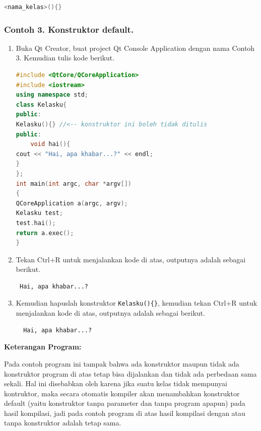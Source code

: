 \begin{lstlisting}[language=c++]
<nama_kelas>(){}
\end{lstlisting}

\subsubsection*{Contoh 3. Konstruktor default.}

\begin{enumerate}
\def\labelenumi{\arabic{enumi}.}
\item
  Buka Qt Creator, buat project Qt Console Application dengan nama
  Contoh 3. Kemudian tulis kode berikut.

\begin{lstlisting}[language=c++]
#include <QtCore/QCoreApplication>
#include <iostream>
using namespace std;
class Kelasku{
public:
Kelasku(){} //<-- konstruktor ini boleh tidak ditulis
public:
    void hai(){
cout << "Hai, apa khabar...?" << endl;
}
};
int main(int argc, char *argv[])
{
QCoreApplication a(argc, argv);
Kelasku test;
test.hai();
return a.exec();
}
\end{lstlisting}
\item
  Tekan Ctrl+R untuk menjalankan kode di atas, outputnya adalah sebagai
  berikut.

\begin{verbatim}
 Hai, apa khabar...?
\end{verbatim}



\item
  Kemudian hapuslah konstruktor \texttt{Kelasku()\{\}}, kemudian tekan
  Ctrl+R untuk menjalankan kode di atas, outputnya adalah sebagai
  berikut.
  \begin{verbatim}
  Hai, apa khabar...?
  \end{verbatim}
\end{enumerate}



\textbf{Keterangan Program:}

Pada contoh program ini tampak bahwa ada konstruktor maupun tidak ada
konstruktor program di atas tetap bisa dijalankan dan tidak ada
perbedaan sama sekali. Hal ini disebabkan oleh karena jika suatu kelas
tidak mempunyai kontruktor, maka secara otomatis kompiler akan
menambahkan konstruktor default (yaitu konstruktor tanpa parameter dan
tanpa program apapun) pada hasil kompilasi, jadi pada contoh program di
atas hasil kompilasi dengan atau tanpa konstruktor adalah tetap sama.

